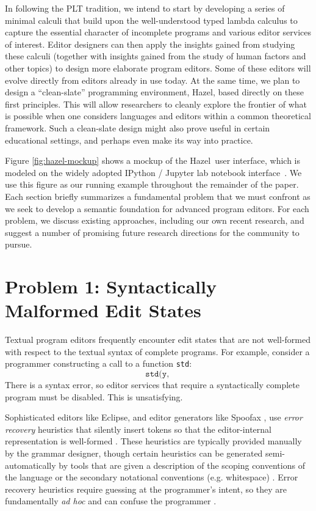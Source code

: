 \documentclass[letterpaper,USenglish]{lipics-v2016}
\newcommand{\Hazel}[0]{\textsf{Hazel}}
\begin{document}
In following the PLT tradition, we intend to start by developing a series of minimal calculi that build upon the well-understood typed lambda calculus to capture the essential character of incomplete programs and various editor services of interest. Editor designers can then apply the insights gained from studying these calculi (together with insights gained from the study of human factors and other topics) to design more elaborate program editors. Some of these editors will evolve directly from editors already in use today. At the same time, we plan to design a ``clean-slate'' programming environment, \Hazel, based directly on these first principles. This will allow researchers to cleanly explore the frontier of what is possible when one considers languages and editors within a common theoretical framework. Such a clean-slate design might also prove useful in certain educational settings, and perhaps even make its way into practice.

Figure \ref{fig:hazel-mockup} shows a mockup of the \Hazel ~user interface, which is modeled on the widely adopted IPython / Jupyter lab notebook interface~\cite{PER-GRA:2007}. 
We use this figure as our running example 
throughout the remainder of the paper. Each section briefly summarizes a fundamental problem that we must confront as we seek to develop a semantic foundation for advanced program editors. For each problem, we discuss existing approaches, including our own recent research, and suggest a number of promising future research directions for the community to pursue.

\section{Problem 1: Syntactically Malformed Edit States} 
Textual program editors frequently encounter edit states
that are not well-formed with respect to the textual syntax of complete
programs. For example, consider a programmer constructing a call to a function \lstinline{std}: 
\[
\texttt{std(y, }
\]
There is a syntax
error, so editor services that require a syntactically
complete program must be disabled. This is unsatisfying. 

Sophisticated editors like Eclipse, and editor generators like Spoofax \cite{DBLP:conf/oopsla/KatsV10}, use \emph{error recovery} heuristics that silently insert tokens so that the editor-internal representation is well-formed \cite{DBLP:journals/siamcomp/AhoP72,charles1991practical,graham1979practical,DBLP:conf/oopsla/KatsJNV09}. These heuristics are typically provided manually by the grammar designer, though certain heuristics can be generated semi-automatically by tools that are given a description of the scoping conventions of the language or the secondary notational conventions (e.g. whitespace) \cite{DBLP:conf/oopsla/KatsJNV09,DBLP:conf/sle/JongeNKV09}. Error recovery heuristics require guessing at the programmer's intent, so they are fundamentally \emph{ad hoc} and can confuse the programmer \cite{DBLP:conf/oopsla/KatsJNV09}.
\end{document}
